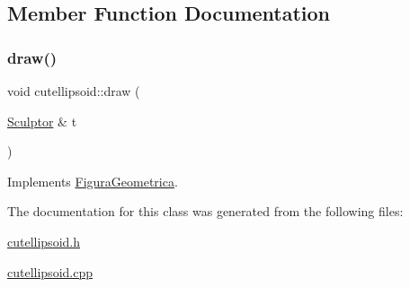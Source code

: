\subsection{Member Function Documentation}
\mbox{\label{classcutellipsoid_a932dbc381691f5b42c7062c6699c7867}} 
\subsubsection{\texorpdfstring{draw()}{draw()}}
{\footnotesize\ttfamily void cutellipsoid\+::draw (\begin{DoxyParamCaption}\item[{\mbox{\hyperlink{class_sculptor}{Sculptor}} \&}]{t }\end{DoxyParamCaption})\hspace{0.3cm}{\ttfamily [virtual]}}



Implements \mbox{\hyperlink{class_figura_geometrica_a34585fd7c0bd7378fc69c4ee208e676c}{Figura\+Geometrica}}.



The documentation for this class was generated from the following files\+:\begin{DoxyCompactItemize}
\item 
\mbox{\hyperlink{cutellipsoid_8h}{cutellipsoid.\+h}}\item 
\mbox{\hyperlink{cutellipsoid_8cpp}{cutellipsoid.\+cpp}}\end{DoxyCompactItemize}
